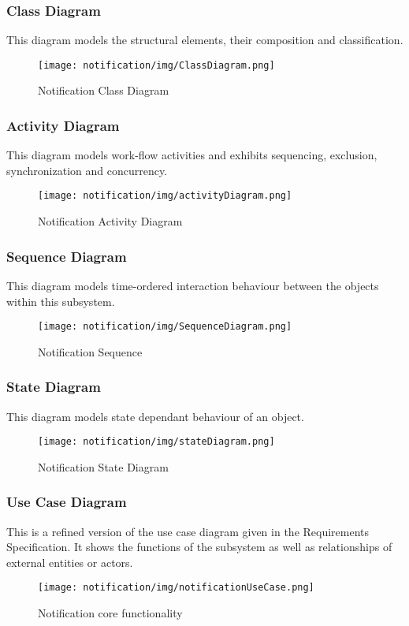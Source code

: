 \subsubsection{Class Diagram}
This diagram models the structural elements, their composition and classification.

\begin{figure}[H]
	\centering
	\texttt{[image: notification/img/ClassDiagram.png]}
	\caption{Notification Class Diagram}
\end{figure}

\newpage
\subsubsection{Activity Diagram}
This diagram models work-flow activities and exhibits sequencing, exclusion, synchronization and concurrency.
\begin{figure}[H]
	\centering
	\texttt{[image: notification/img/activityDiagram.png]}
	\caption{Notification Activity Diagram}
\end{figure}


\subsubsection{Sequence Diagram}
This diagram models time-ordered interaction behaviour between the objects within this subsystem.
\begin{figure}[H]
	\centering
	\texttt{[image: notification/img/SequenceDiagram.png]}
	\caption{Notification Sequence}
\end{figure}

\newpage
\subsubsection{State Diagram}
This diagram models state dependant behaviour of an object.
\begin{figure}[H]
	\centering
	\texttt{[image: notification/img/stateDiagram.png]}
	\caption{Notification State Diagram}
\end{figure}




\subsubsection{Use Case Diagram}
This is a refined version of the use case diagram given in the Requirements Specification. It shows the functions of the subsystem as well as relationships of external entities or actors.
\begin{figure}[H]
	\centering
	\texttt{[image: notification/img/notificationUseCase.png]}
	\caption{Notification core functionality }
\end{figure}
